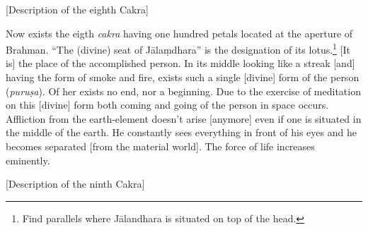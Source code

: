 \begin{otherlanguage}{english}
\begin{tlate}
  \end{tlate}
    \bigskip
    \centerline{\textrm{\small{[Description of the eighth Cakra]}}}
    \bigskip
          \begin{tlate}
Now exists the eigth \textit{cakra} having one hundred petals located at the aperture of Brahman.  ``The (divine) seat of  Jālaṃdhara'' is the designation of its lotus.\footnote{Find parallels where Jālandhara is situated on top of the head.} [It is] the place of the accomplished person. In its middle looking like a streak [and] having the form of smoke and fire, exists such a single [divine] form of the person (\textit{puruṣa}). Of her exists no end, nor a beginning. Due to the exercise of meditation on this [divine] form both coming and going of the person in space occurs. Affliction from the earth-element doesn't arise [anymore] even if one is situated in the middle of the earth. He constantly sees everything in front of his eyes and he becomes separated [from the material world]. The force of life increases eminently.    
     \end{tlate}
       \bigskip
    \centerline{\textrm{\small{[Description of the ninth Cakra]}}}
    \bigskip
    \begin{tlate}

\end{tlate}
\end{otherlanguage}
